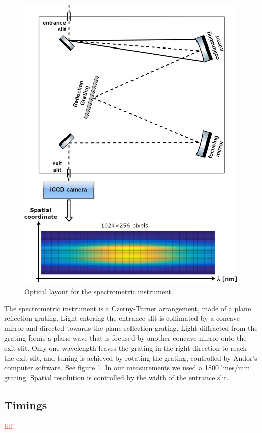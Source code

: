 \documentclass[justified,nofonts,nobib]{tufte-book}
\begin{document}
\begin{figure}
\centering
\includegraphics[width=\textwidth]{./figures/spectrometer.PNG}
\caption{Optical layout for the spectrometric instrument.}
\label{fig:spectrometer}
\end{figure}
The spectrometric instrument is a Czerny-Turner arrangement, made of a plane reflection grating. Light entering the entrance slit is collimated by a concave mirror and directed towards the plane reflection grating. Light diffracted from the grating forms a plane wave that is focused by another concave mirror onto the exit slit. Only one wavelength leaves the grating in the right direction to reach the exit slit, and tuning is achieved by rotating the grating, controlled by Andor's computer software. See figure \ref{fig:spectrometer}. In our measurements we used a 1800 lines/mm grating. Spatial resolution is controlled by the width of the entrance slit.

\subsection{Timings}
	\textcolor{red}{fill!}
	
\end{document}
